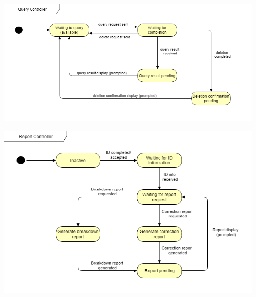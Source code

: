 \documentclass[]{article}
\begin{document}
\begin{center}
\includegraphics[scale=0.5]{QueryController}
\end{center}
\begin{center}
\includegraphics[scale=0.5]{ReportController}
\end{center}

\newpage
\end{document}
